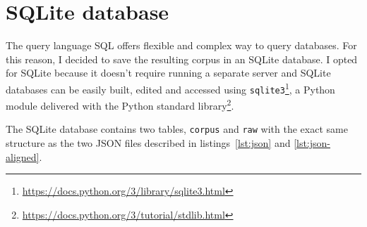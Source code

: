 
\section{SQLite database}
The query language SQL offers flexible and complex way to query databases. 
For this reason, I decided to save the resulting corpus in an SQLite database. 
I opted for SQLite because it doesn't require running a separate server and SQLite databases can be easily built, edited and accessed using \texttt{sqlite3}\footnote{\url{https://docs.python.org/3/library/sqlite3.html}}, a Python module delivered with the Python standard library\footnote{\url{https://docs.python.org/3/tutorial/stdlib.html}}.

The SQLite database contains two tables, \texttt{corpus} and \texttt{raw} with the exact same structure as the two JSON files described in listings~\ref{lst:json} and \ref{lst:json-aligned}.

